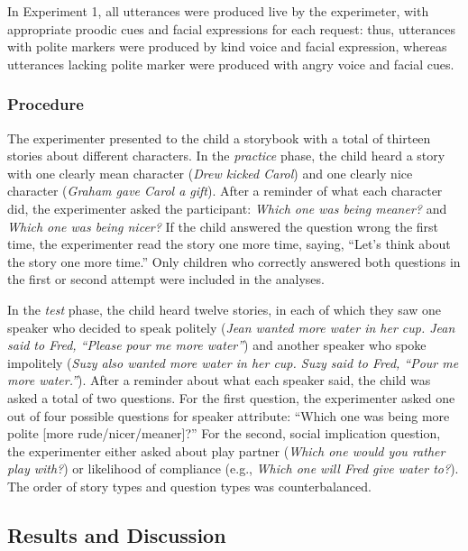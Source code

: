 \documentclass[10pt, letterpaper]{article}
\begin{document}
In Experiment 1, all utterances were produced live by the experimeter,
with appropriate proodic cues and facial expressions for each request:
thus, utterances with polite markers were produced by kind voice and
facial expression, whereas utterances lacking polite marker were
produced with angry voice and facial cues.

\subsubsection{Procedure}\label{procedure}

The experimenter presented to the child a storybook with a total of
thirteen stories about different characters. In the \emph{practice}
phase, the child heard a story with one clearly mean character
(\emph{Drew kicked Carol}) and one clearly nice character (\emph{Graham
gave Carol a gift}). After a reminder of what each character did, the
experimenter asked the participant: \emph{Which one was being meaner?}
and \emph{Which one was being nicer?} If the child answered the question
wrong the first time, the experimenter read the story one more time,
saying, ``Let's think about the story one more time.'' Only children who
correctly answered both questions in the first or second attempt were
included in the analyses.

In the \emph{test} phase, the child heard twelve stories, in each of
which they saw one speaker who decided to speak politely (\emph{Jean
wanted more water in her cup. Jean said to Fred, ``Please pour me more
water''}) and another speaker who spoke impolitely (\emph{Suzy also
wanted more water in her cup. Suzy said to Fred, ``Pour me more
water.''}). After a reminder about what each speaker said, the child was
asked a total of two questions. For the first question, the experimenter
asked one out of four possible questions for speaker attribute: ``Which
one was being more polite {[}more rude/nicer/meaner{]}?'' For the
second, social implication question, the experimenter either asked about
play partner (\emph{Which one would you rather play with?}) or
likelihood of compliance (e.g., \emph{Which one will Fred give water
to?}). The order of story types and question types was counterbalanced.

\subsection{Results and Discussion}\label{results-and-discussion}
\end{document}
